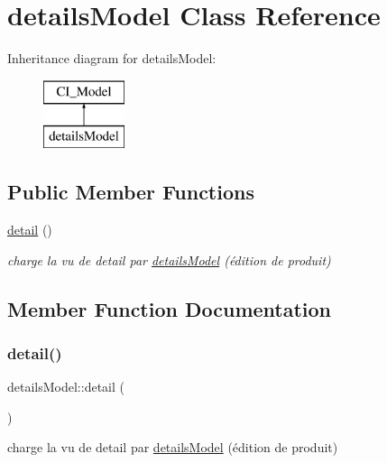 \hypertarget{classdetails_model}{}\section{details\+Model Class Reference}
\label{classdetails_model}
Inheritance diagram for details\+Model\+:\begin{figure}[H]
\begin{center}
\leavevmode
\includegraphics[height=2.000000cm]{classdetails_model}
\end{center}
\end{figure}
\subsection*{Public Member Functions}
\begin{DoxyCompactItemize}
\item 
\mbox{\hyperlink{classdetails_model_adad81c17e7723f978e3010ec8727270f}{detail}} ()
\begin{DoxyCompactList}\small\item\em charge la vu de detail par \mbox{\hyperlink{classdetails_model}{details\+Model}} (édition de produit) \end{DoxyCompactList}\end{DoxyCompactItemize}


\subsection{Member Function Documentation}
\mbox{\label{classdetails_model_adad81c17e7723f978e3010ec8727270f}} 
\subsubsection{\texorpdfstring{detail()}{detail()}}
{\footnotesize\ttfamily details\+Model\+::detail (\begin{DoxyParamCaption}{ }\end{DoxyParamCaption})}



charge la vu de detail par \mbox{\hyperlink{classdetails_model}{details\+Model}} (édition de produit) 

